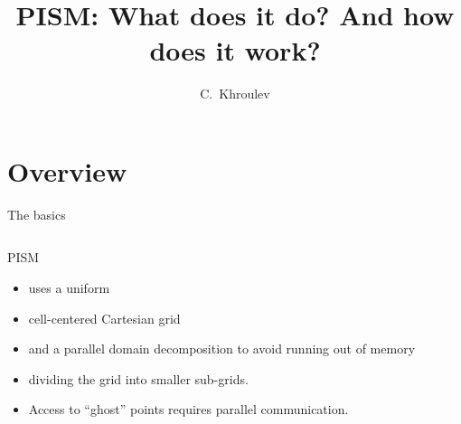 \documentclass[hide notes,intlimits]{beamer}
\title{PISM: What does it do? And how does it work?}
\author{C.~Khroulev}
\institute{University of Alaska Fairbanks}
\date{}
\begin{document}
\begin{frame}
  \titlepage
\end{frame}


\section{Overview}
\label{sec:overview}

\begin{frame}{The basics}

  \begin{columns}
    \begin{column}{0.5\linewidth}
      PISM
      \begin{itemize}
      \item<1-> uses a uniform
      \item<2-> cell-centered Cartesian grid
      \item<3-> and a parallel domain decomposition to avoid running out
        of memory
      \item<4-> dividing the grid into smaller sub-grids.
      \item<5> Access to ``ghost'' points requires parallel communication.
      \end{itemize}
    \end{column}


\end{columns}
\end{frame}
\end{document}
